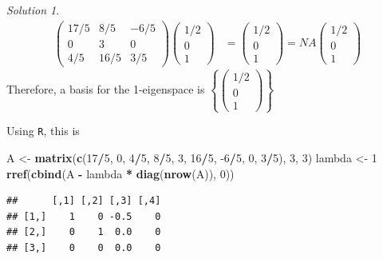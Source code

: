 \documentclass[
]{book}
\newenvironment{Shaded}{\begin{snugshade}}{\end{snugshade}}
\newcommand{\DecValTok}[1]{\textcolor[rgb]{0.00,0.00,0.81}{#1}}
\newcommand{\KeywordTok}[1]{\textcolor[rgb]{0.13,0.29,0.53}{\textbf{#1}}}
\newcommand{\NormalTok}[1]{#1}
\newcommand{\OperatorTok}[1]{\textcolor[rgb]{0.81,0.36,0.00}{\textbf{#1}}}
\newcommand{\StringTok}[1]{\textcolor[rgb]{0.31,0.60,0.02}{#1}}
\theoremstyle{definition}
\theoremstyle{definition}
\theoremstyle{definition}
\theoremstyle{definition}
\theoremstyle{remark}
\newtheorem*{solution}{Solution}
\begin{document}
\begin{solution}
\[\begin{aligned}
\begin{pmatrix} 17/5 & 8/5 & -6/5 \\ 0 & 3 & 0 \\ 4/5 & 16/5 & 3/5 \end{pmatrix} \begin{pmatrix} 1/2 \\ 0 \\ 1 \end{pmatrix} & = \begin{pmatrix} 1/2 \\ 0 \\ 1 \end{pmatrix}  = NA \begin{pmatrix} 1/2 \\ 0 \\ 1 \end{pmatrix}
\end{aligned}
\]
Therefore, a basis for the 1-eigenspace is \(\left\{ \begin{pmatrix} 1/2 \\ 0 \\ 1 \end{pmatrix} \right\}\)

Using \texttt{R}, this is

\begin{Shaded}
\begin{Highlighting}[]
\NormalTok{A <-}\StringTok{ }\KeywordTok{matrix}\NormalTok{(}\KeywordTok{c}\NormalTok{(}\DecValTok{17}\OperatorTok{/}\DecValTok{5}\NormalTok{, }\DecValTok{0}\NormalTok{, }\DecValTok{4}\OperatorTok{/}\DecValTok{5}\NormalTok{, }\DecValTok{8}\OperatorTok{/}\DecValTok{5}\NormalTok{, }\DecValTok{3}\NormalTok{, }\DecValTok{16}\OperatorTok{/}\DecValTok{5}\NormalTok{, }\DecValTok{-6}\OperatorTok{/}\DecValTok{5}\NormalTok{, }\DecValTok{0}\NormalTok{, }\DecValTok{3}\OperatorTok{/}\DecValTok{5}\NormalTok{), }\DecValTok{3}\NormalTok{, }\DecValTok{3}\NormalTok{)}
\NormalTok{lambda <-}\StringTok{ }\DecValTok{1}
\KeywordTok{rref}\NormalTok{(}\KeywordTok{cbind}\NormalTok{(A }\OperatorTok{-}\StringTok{ }\NormalTok{lambda }\OperatorTok{*}\StringTok{ }\KeywordTok{diag}\NormalTok{(}\KeywordTok{nrow}\NormalTok{(A)), }\DecValTok{0}\NormalTok{))}
\end{Highlighting}
\end{Shaded}

\begin{verbatim}
##      [,1] [,2] [,3] [,4]
## [1,]    1    0 -0.5    0
## [2,]    0    1  0.0    0
## [3,]    0    0  0.0    0
\end{verbatim}


\end{solution}
\end{document}
